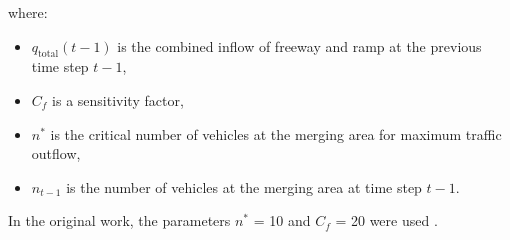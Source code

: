 \begin{enumerate}[itemsep=0.8em, leftmargin=1.5em]
    where:

    \begin{itemize}[label={}, nosep, leftmargin=1em]
        \item $q_{\text{total}}(t-1)$ is the combined inflow of freeway and ramp at the previous time step $t-1$,
        \item $C_f$ is a sensitivity factor,
        \item $n^*$ is the critical number of vehicles at the merging area for maximum traffic outflow,
        \item $n_{t-1}$ is the number of vehicles at the merging area at time step $t-1$.
    \end{itemize}

    \medskip
    In the original work, the parameters $n^*$ = 10 and $C_f$ = 20 were used \cite{hou2021rampmeter}.

\end{enumerate} 
